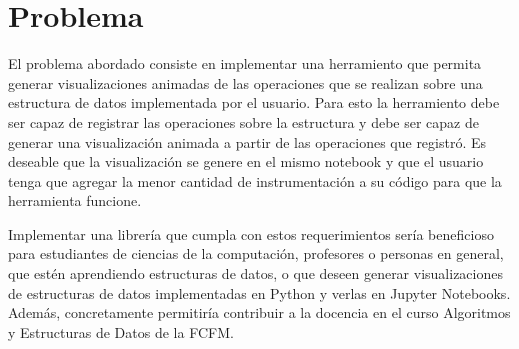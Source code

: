 \chapter{Problema}


El problema abordado consiste en implementar una herramiento que permita generar visualizaciones animadas de las operaciones que se realizan sobre una estructura de datos implementada por el usuario. Para esto la herramiento debe ser capaz de registrar las operaciones sobre la estructura y debe ser capaz de generar una visualización animada a partir de las operaciones que registró. Es deseable que la visualización se genere en el mismo notebook y que el usuario tenga que agregar la menor cantidad de instrumentación a su código para que la herramienta funcione.

Implementar una librería que cumpla con estos requerimientos sería beneficioso para estudiantes de ciencias de la computación, profesores o personas en general, que estén aprendiendo estructuras de datos, o que deseen generar visualizaciones de estructuras de datos implementadas en Python y verlas en Jupyter Notebooks. Además, concretamente permitiría contribuir a la docencia en el curso Algoritmos y Estructuras de Datos de la FCFM.

